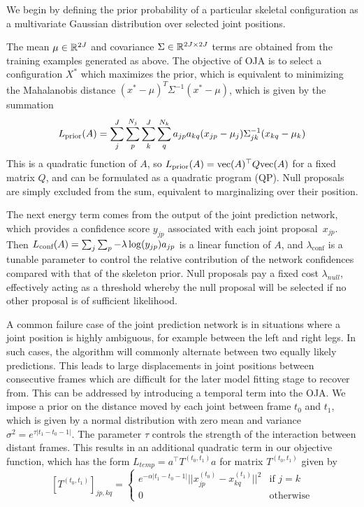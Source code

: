  We begin by defining the prior probability of a particular skeletal configuration as a multivariate Gaussian distribution over selected joint positions.

The mean $\mu \in {\mathbb{R}^{2J}}$ and covariance $\Sigma \in {\mathbb{R}^{2J\times 2J}}$ terms are obtained from the training examples generated as above. The objective of OJA is to select a configuration $X^*$ which maximizes the prior, which is equivalent to minimizing the Mahalanobis distance
$(x^*-\mu)^T\Sigma^{-1}(x^*-\mu)$, which is given by the summation
\begin{equation}
L_{\text{prior}}(A) = \sum_j^J\sum_p^{N_j}\sum_k^J\sum_q^{N_k}a_{jp}a_{kq}(x_{jp} - \mu_j)\Sigma_{jk}^{-1}(x_{kq}-\mu_k)
\end{equation}
This is a quadratic function of $A$, so $L_{\text{prior}}(A) = \text{vec}(A)^\top Q \text{vec}(A)$ for a fixed matrix $Q$, and can be formulated as a quadratic program (QP).  Null proposals are simply excluded from the sum, equivalent to marginalizing over their position. 

The next energy term comes from the output of the joint prediction network, which provides a confidence score $y_{jp}$ associated with each joint proposal~$x_{jp}$.  Then $L_{\text{conf}}(A) = \sum_j\sum_p -\lambda\log(y_{jp}) a_{jp}$ is a linear function of $A$, 
and $\lambda_{\text{conf}}$ is a tunable parameter to control the relative contribution of the network confidences compared with that of the skeleton prior.
Null proposals pay a fixed cost $\lambda_{null}$, effectively acting as a threshold whereby the null proposal will be selected if no other proposal is of sufficient likelihood. 

A common failure case of the joint prediction network is in situations where a joint position is highly ambiguous, for example between the left and right legs. In such cases, the algorithm will commonly alternate between two equally likely predictions. This leads to large displacements in joint positions between consecutive frames which are difficult for the later model fitting stage to recover from. This can be addressed by introducing a temporal term into the OJA. We impose a prior on the distance moved by each joint between frame $t_0$ and $t_1$, which is given by a normal distribution with zero mean and variance $\sigma^{2} =e^{\tau|t_1 - t_0 - 1|}$. 
The parameter $\tau$ controls the strength of the interaction between distant frames. This results in an additional quadratic term in our objective function, which has the form $L_{temp} = a^\top T^{(t_0, t_1)} a$ for matrix $T^{(t_0, t_1)}$ given by 
\begin{equation}
\left[T^{(t_0, t_1)}\right]_{jp, kq} = \begin{cases}
e^{-\alpha|t_1 - t_0 - 1|}||x^{(t_0)}_{jp} - x^{(t_1)}_{kq}||^2 & \text{if } j=k\\
0 & \text{otherwise}
\end{cases}
\end{equation}


